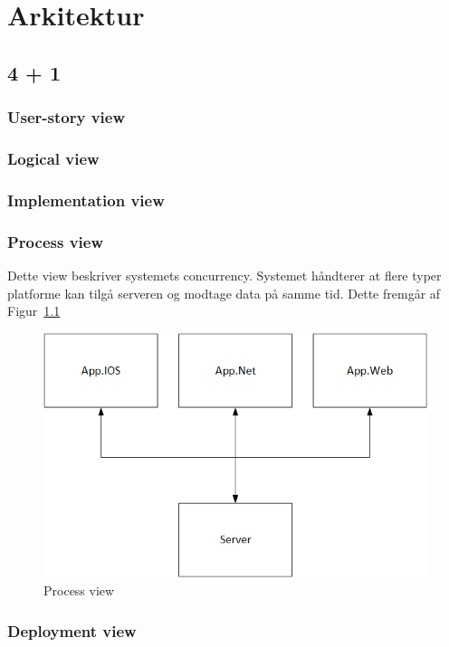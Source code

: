 \chapter{Arkitektur}


\lipsum[2]

\section{4 + 1}

\subsection{User-story view}

\subsection{Logical view}

\subsection{Implementation view} %

\subsection{Process view}
Dette view beskriver systemets concurrency. Systemet håndterer at flere typer platforme kan tilgå serveren og modtage data på samme tid. Dette fremgår af Figur~\ref{fig:processview}
\begin{figure}
	\centering
	\includegraphics[width=0.7\linewidth]{figs/arkitektur/Processview.png}
	\caption{Process view}
	\label{fig:processview}
\end{figure}

\subsection{Deployment view} %

